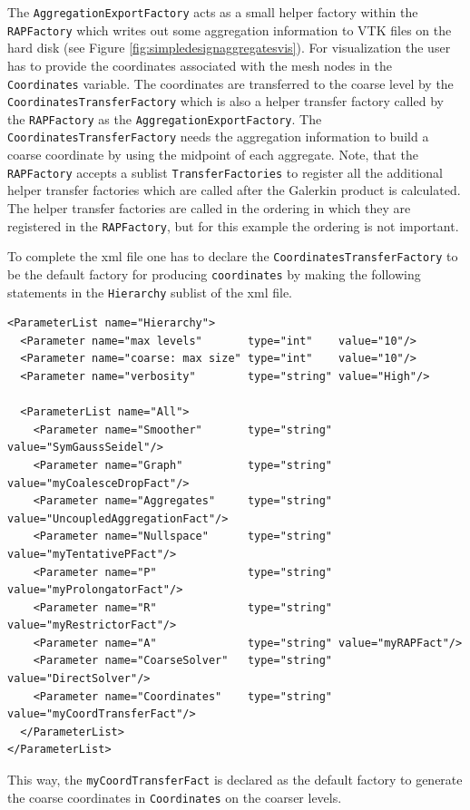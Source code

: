 \documentclass[10pt,fleqn]{book}
\begin{document}
The \verb|AggregationExportFactory| acts as a small helper factory within the \verb|RAPFactory| which writes out some aggregation information to VTK files on the hard disk (see Figure \ref{fig:simpledesignaggregatesvis}). For visualization the user has to provide the coordinates associated with the mesh nodes in the \verb|Coordinates| variable. The coordinates are transferred to the coarse level by the \verb|CoordinatesTransferFactory| which is also a helper transfer factory called by the \verb|RAPFactory| as the \verb|AggregationExportFactory|. The \verb|CoordinatesTransferFactory| needs the aggregation information to build a coarse coordinate by using the midpoint of each aggregate.
Note, that the \verb|RAPFactory| accepts a sublist \verb|TransferFactories| to register all the additional helper transfer factories which are called after the Galerkin product is calculated. The helper transfer factories are called in the ordering in which they are registered in the \verb|RAPFactory|, but for this example the ordering is not important.

To complete the xml file one has to declare the \verb|CoordinatesTransferFactory| to be the default factory for producing \verb|coordinates| by making the following statements in the \verb|Hierarchy| sublist of the xml file.

\begin{lstlisting}
<ParameterList name="Hierarchy">
  <Parameter name="max levels"       type="int"    value="10"/>
  <Parameter name="coarse: max size" type="int"    value="10"/>
  <Parameter name="verbosity"        type="string" value="High"/>

  <ParameterList name="All">
    <Parameter name="Smoother"       type="string" value="SymGaussSeidel"/>
    <Parameter name="Graph"          type="string" value="myCoalesceDropFact"/>
    <Parameter name="Aggregates"     type="string" value="UncoupledAggregationFact"/>
    <Parameter name="Nullspace"      type="string" value="myTentativePFact"/>
    <Parameter name="P"              type="string" value="myProlongatorFact"/>
    <Parameter name="R"              type="string" value="myRestrictorFact"/>
    <Parameter name="A"              type="string" value="myRAPFact"/>
    <Parameter name="CoarseSolver"   type="string" value="DirectSolver"/>
    <Parameter name="Coordinates"    type="string" value="myCoordTransferFact"/>
  </ParameterList>
</ParameterList>
\end{lstlisting}

This way, the \verb|myCoordTransferFact| is declared as the default factory to generate the coarse coordinates in \verb|Coordinates| on the coarser levels.
\end{document}
